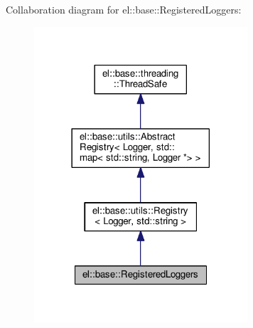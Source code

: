 Collaboration diagram for el\+:\+:base\+:\+:Registered\+Loggers\+:
\nopagebreak
\begin{figure}[H]
\begin{center}
\leavevmode
\includegraphics[width=225pt]{classel_1_1base_1_1_registered_loggers__coll__graph}
\end{center}
\end{figure}
